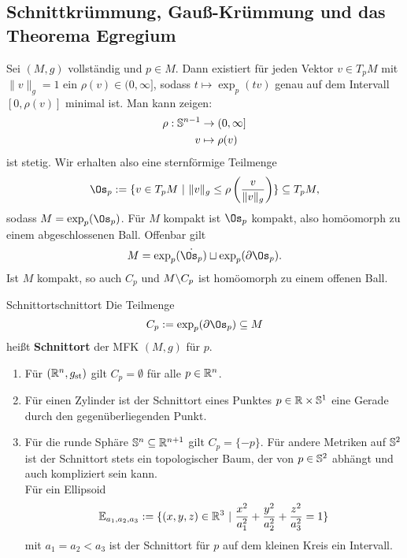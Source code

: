 \subsection{Schnittkrümmung, Gauß-Krümmung und das Theorema Egregium}
\label{schnittgauß}
\begin{bemerkung}
Sei $(M,g)$ vollständig und $p \in M$. Dann existiert für jeden Vektor $v \in T_pM$ mit $\| v \|_g = 1$ ein $\rho (v) \in (0, \infty]$, sodass $t \mapsto \exp_p (tv)$ genau auf dem Intervall $[0,\rho(v)]$ minimal ist. Man kann zeigen:
\begin{align}
\rho: \mathbb{S}^{n-1} &\to (0, \infty]\\
v &\mapsto \rho(v)
\end{align}
ist stetig. Wir erhalten also eine sternförmige Teilmenge
\begin{equation}
\Os_p := \{ v \in T_pM \ | \ \|v\|_g \leq \rho \left(\frac{v}{\|v\|_g} \right)\} \sub T_pM,
\end{equation}
sodass $M = \exp_p (\Os_p)$. Für $M$ kompakt ist $\Os_p$ kompakt, also homöomorph zu einem abgeschlossenen Ball. Offenbar gilt
\begin{equation}
M = \exp_p(\dot{\Os_p}) \sqcup \exp_p(\partial \Os_p).
\end{equation}
Ist $M$ kompakt, so auch $C_p$ und $M \backslash C_p$ ist homöomorph zu einem offenen Ball.
\end{bemerkung}
\begin{definition}{Schnittort}{schnittort}
Die Teilmenge 
\begin{equation}
C_p := \exp_p(\partial \Os_p) \sub M
\end{equation}
heißt \textbf{Schnittort} der MFK $(M,g)$ für $p$.
\end{definition}
\begin{beispiele}
\begin{enumerate}
\item Für $(\mathbb{R}^n, g_\text{st})$ gilt $C_p = \emptyset$ für alle $p \in \mathbb{R}^n$.
\item Für einen Zylinder ist der Schnittort eines Punktes $p \in \mathbb{R} \times \mathbb{S}^1$ eine Gerade durch den gegenüberliegenden Punkt.
\item Für die runde Sphäre $\mathbb{S}^n \subseteq \mathbb{R}^{n+1}$ gilt $C_p = \{-p\}$. Für andere Metriken auf $\mathbb{S}^2$ ist der Schnittort stets ein topologischer Baum, der von $p \in \mathbb{S}^2$ abhängt und auch kompliziert sein kann.\\
Für ein Ellipsoid
\begin{equation}
\mathbb{E}_{a_1,a_2,a_3} := \{(x,y,z) \in \mathbb{R}^3 \ | \ \frac{x^2}{a_1^2}+ \frac{y^2}{a_2^2} + \frac{z^2}{a_3^2} = 1 \}
\end{equation}
mit $a_1 = a_2 < a_3$ ist der Schnittort für $p$ auf dem kleinen Kreis ein Intervall.
\end{enumerate}
\end{beispiele}
